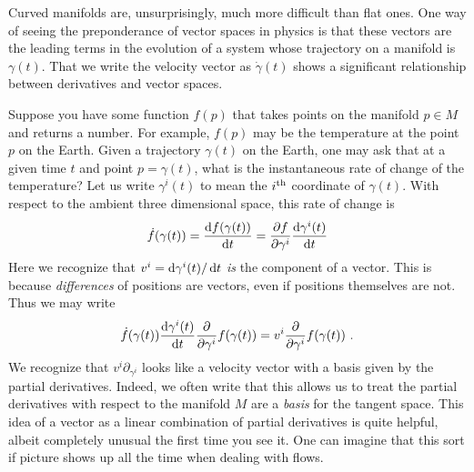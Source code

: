 \documentclass[12pt, oneside]{report}    %
\begin{document}
Curved manifolds are, unsurprisingly, much more difficult than flat ones. One way of seeing the preponderance of vector spaces in physics is that these vectors are the leading terms in the evolution of a system whose trajectory on a manifold is $\gamma(t)$. That we write the velocity vector as $\dot\gamma(t)$ shows a significant relationship between derivatives and vector spaces. 

Suppose you have some function $f(p)$ that takes points on the manifold $p\in M$ and returns a number. For example, $f(p)$ may be the temperature at the point $p$ on the Earth. Given a trajectory $\gamma(t)$ on the Earth, one may ask that at a given time $t$ and point $p=\gamma(t)$, what is the instantaneous rate of change of the temperature? Let us write $\gamma^i(t)$ to mean the $i^\textnormal{th}$ coordinate of $\gamma(t)$.
% 
With respect to the ambient three dimensional space, this rate of change is
\begin{align}
    \dot f(\gamma(t)) = \frac{\operatorname{d}\!{f(\gamma(t))}}{\operatorname{d}\!{t}} = 
    \frac{\partial f}{\partial \gamma^i}
    \frac{\operatorname{d}\!{\gamma^i(t)}}{\operatorname{d}\!{t}}
\end{align}
Here we recognize that $v^i= \operatorname{d}\!{\gamma^i(t)}/\operatorname{d}\!{t}$ \emph{is} the component of a vector. This is because \emph{differences} of positions are vectors, even if positions themselves are not. Thus we may write
\begin{align}
    \dot f(\gamma(t)) %
    \frac{\D{\gamma^i(t)}}{\D{t}}
    \frac{\partial}{\partial \gamma^i}
    f(\gamma(t))
    =
    v^i
    \frac{\partial}{\partial \gamma^i}
    f(\gamma(t)) \ .
\end{align}
We recognize that $v^i \partial_{\gamma^i}$ looks like a velocity vector with a basis given by the partial derivatives. Indeed, we often write that this allows us to treat the partial derivatives with respect to the manifold $M$ are a \emph{basis} for the tangent space. This idea of a vector as a linear combination of partial derivatives is quite helpful, albeit completely unusual the first time you see it. One can imagine that this sort if picture shows up all the time when dealing with flows.
\end{document}
